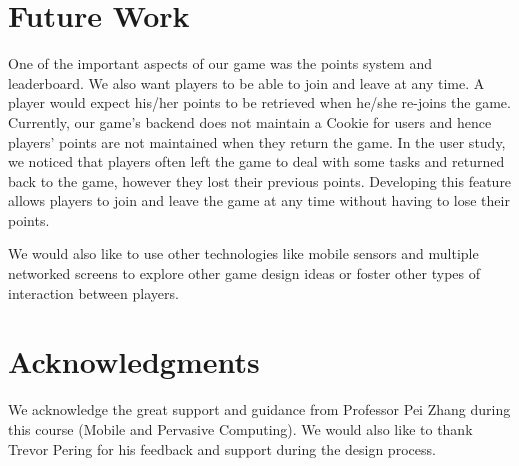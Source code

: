 \documentclass{sig-alternate}
\begin{document}
\section{Future Work}
One of the important aspects of our game was the points system and leaderboard. We also want players to be able to join and leave at any time. A player would expect his/her points to be retrieved when 
he/she re-joins the game. 
Currently, our game's backend does not maintain a Cookie for users and hence players' points are not maintained when they return the game. In the user study, we noticed that players often left the game to deal with some tasks and returned back to the game, however they lost their previous points. Developing this feature allows players to join and leave the game at any time without having to lose their points.

We would also like to use other technologies like mobile sensors and multiple networked screens to explore other game design ideas or foster other types of interaction between players.

\section{Acknowledgments}
We acknowledge the great support and guidance from Professor Pei Zhang during this course (Mobile and Pervasive Computing). We would also like to thank Trevor Pering for his feedback and support during the design process. 



\end{document}
